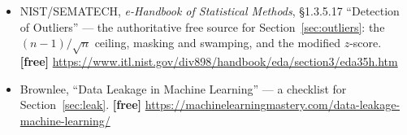 \documentclass[11pt]{article}
\begin{document}
\begin{itemize}[leftmargin=*]
  \item NIST/SEMATECH, \emph{e-Handbook of Statistical Methods}, \S1.3.5.17
    ``Detection of Outliers'' --- the authoritative free source for
    Section~\ref{sec:outliers}: the $(n-1)/\sqrt{n}$ ceiling, masking and
    swamping, and the modified $z$-score. \textbf{[free]}
    \url{https://www.itl.nist.gov/div898/handbook/eda/section3/eda35h.htm}
  \item Brownlee, ``Data Leakage in Machine Learning'' --- a checklist for
    Section~\ref{sec:leak}. \textbf{[free]}
    \url{https://machinelearningmastery.com/data-leakage-machine-learning/}
\end{itemize}

\enlargethispage{4\baselineskip}
\notesources{\AMLUnitIVSources}
\end{document}
